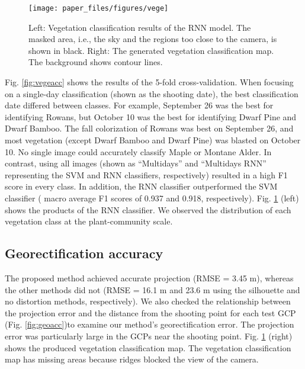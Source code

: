 \documentclass{article}
\begin{document}
\begin{figure}
\texttt{[image: paper\_files/figures/vege]} \caption{Left: Vegetation classification results of the RNN model. The masked area, i.e., the sky and the regions too close to the camera, is shown in black. Right: The generated vegetation classification map. The background shows contour lines.}\label{fig:vegetation}
\end{figure}

Fig. \ref{fig:vegeacc} shows the results of the 5-fold cross-validation. When focusing on a single-day classification (shown as the shooting date), the best classification date differed between classes. For example, September 26 was the best for identifying Rowans, but October 10 was the best for identifying Dwarf Pine and Dwarf Bamboo. The fall colorization of Rowans was best on September 26, and most vegetation (except Dwarf Bamboo and Dwarf Pine) was blasted on October 10. No single image could accurately classify Maple or Montane Alder. In contrast, using all images (shown as ``Multidays'' and ``Multidays RNN'' representing the SVM and RNN classifiers, respectively) resulted in a high F1 score in every class. In addition, the RNN classifier outperformed the SVM classifier ( macro average F1 scores of 0.937 and 0.918, respectively). Fig. \ref{fig:vegetation} (left) shows the products of the RNN classifier. We observed the distribution of each vegetation class at the plant-community scale.

\hypertarget{georectification-accuracy}{%
\subsection{Georectification accuracy}\label{georectification-accuracy}}

The proposed method achieved accurate projection (RMSE = 3.45 m), whereas the other methods did not (RMSE = 16.1 m and 23.6 m using the silhouette and no distortion methods, respectively). We also checked the relationship between the projection error and the distance from the shooting point for each test GCP (Fig. \ref{fig:geoacc})to examine our method's georectification error. The projection error was particularly large in the GCPs near the shooting point. Fig. \ref{fig:vegetation} (right) shows the produced vegetation classification map. The vegetation classification map has missing areas because ridges blocked the view of the camera.
\end{document}
